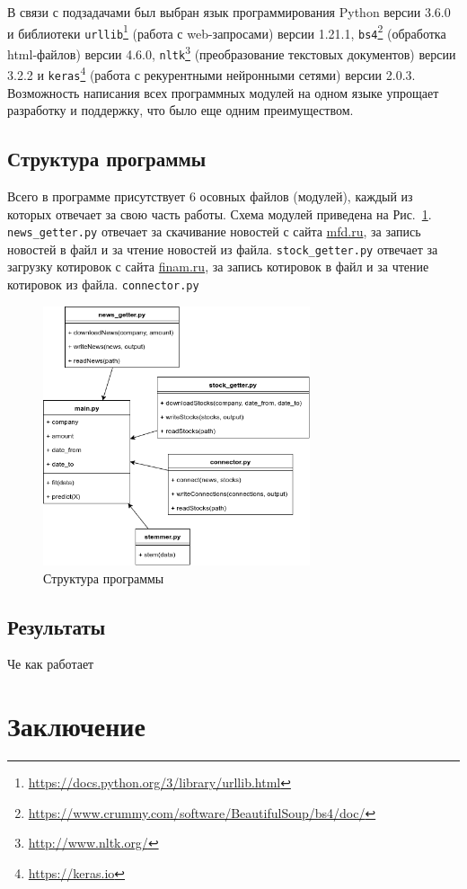 \documentclass[14pt]{matmex-diploma-custom}
\begin{document}
В связи с подзадачами был выбран язык программирования Python версии 3.6.0 и библиотеки \texttt{urllib}\footnote{\url{https://docs.python.org/3/library/urllib.html}} (работа с web-запросами) версии 1.21.1, \texttt{bs4}\footnote{\url{https://www.crummy.com/software/BeautifulSoup/bs4/doc/}} (обработка html-файлов) версии 4.6.0, \texttt{nltk}\footnote{\url{http://www.nltk.org/}}\cite{tools:nltk} (преобразование текстовых документов) версии 3.2.2 и \texttt{keras}\footnote{\url{https://keras.io}}\cite{tools:keras} (работа с рекурентными нейронными сетями) версии 2.0.3. Возможность написания всех программных модулей на одном языке упрощает разработку и поддержку, что было еще одним преимуществом.

\subsection{Структура программы}


Всего в программе присутствует 6 осовных файлов (модулей), каждый из которых отвечает за свою часть работы. Схема модулей приведена на Рис.~\ref{img:class}. \texttt{news\_getter.py} отвечает за скачивание новостей с сайта \url{mfd.ru}, за запись новостей в файл и за чтение новостей из файла. \texttt{stock\_getter.py} отвечает за загрузку котировок с сайта \url{finam.ru}, за запись котировок в файл и за чтение котировок из файла. \texttt{connector.py}

\begin{figure}[h]
\centering
\includegraphics[width=0.7\textwidth]{img/class}
\caption{Структура программы}
\label{img:class}
\end{figure}

\subsection{Результаты}

Че как работает

\clearpage\section*{Заключение}

\setmonofont[Mapping=tex-text]{CMU Typewriter Text}


\end{document}
